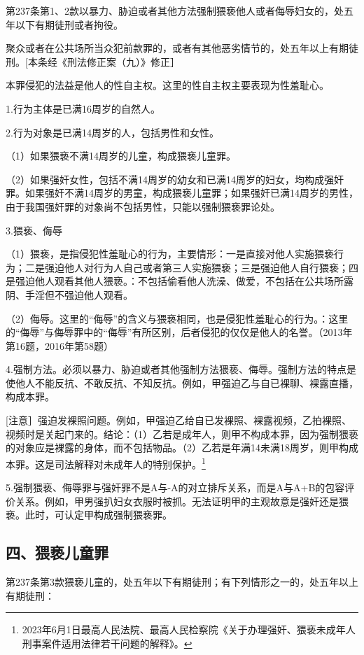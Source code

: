 第237条第1、2款以暴力、胁迫或者其他方法强制猥亵他人或者侮辱妇女的，处五年以下有期徒刑或者拘役。

聚众或者在公共场所当众犯前款罪的，或者有其他恶劣情节的，处五年以上有期徒刑。[本条经《刑法修正案（九）》修正］

本罪侵犯的法益是他人的性自主权。这里的性自主权主要表现为性羞耻心。

1.行为主体是已满16周岁的自然人。

2.行为对象是已满14周岁的人，包括男性和女性。

（1）如果猥亵不满14周岁的儿童，构成猥亵儿童罪。

（2）如果强奸女性，包括不满14周岁的幼女和已满14周岁的妇女，均构成强奸罪。如果强奸不满14周岁的男童，构成猥亵儿童罪；如果强奸已满14周岁的男性，由于我国强奸罪的对象尚不包括男性，只能以强制猥亵罪论处。

3.猥亵、侮辱

（1）猥亵，是指侵犯性羞耻心的行为，主要情形：一是直接对他人实施猥亵行为；二是强迫他人对行为人自己或者第三人实施猥亵；三是强迫他人自行猥亵；四是强迫他人观看其他人猥亵。：不包括偷看他人洗澡、做爱，不包括在公共场所露阴、手淫但不强迫他人观看。

（2）侮辱。这里的“侮辱”的含义与猥亵相同，也是侵犯性羞耻心的行为。：这里的“侮辱”与侮辱罪中的“侮辱”有所区别，后者侵犯的仅仅是他人的名誉。（2013年第16题，2016年第58题）

4.强制方法。必须以暴力、胁迫或者其他强制方法猥亵、侮辱。强制方法的特点是使他人不能反抗、不敢反抗、不知反抗。例如，甲强迫乙与自已裸聊、裸露直播，构成本罪。

[注意］强迫发裸照问题。例如，甲强迫乙给自已发裸照、裸露视频，乙拍裸照、视频时是关起门来的。结论：（1）乙若是成年人，则甲不构成本罪，因为强制猥亵的对象应是裸露的身体，而不包括物品。（2）乙若是年满14未满18周岁，则甲构成本罪。这是司法解释对未成年人的特别保护。\footnote{2023年6月1日最高人民法院、最高人民检察院《关于办理强奸、猥亵未成年人刑事案件适用法律若干问题的解释》。}

5.强制猥亵、侮辱罪与强奸罪不是A与-A的对立排斥关系，而是A与A+B的包容评价关系。例如，甲男强扒妇女衣服时被抓。无法证明甲的主观故意是强奸还是猥亵。此时，可认定甲构成强制猥亵罪。

\subsection*{四、猥亵儿童罪}

第237条第3款猥亵儿童的，处五年以下有期徒刑；有下列情形之一的，处五年以上有期徒刑：

